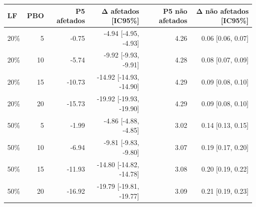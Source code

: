 \begin{tabular}{lrrrrr}
\toprule
LF & PBO & P5 afetados & Δ afetados [IC95\%] & P5 não afetados & Δ não afetados [IC95\%] \\
\midrule
20\% & 5 & -0.75 & -4.94 [-4.95, -4.93] & 4.26 & 0.06 [0.06, 0.07] \\
20\% & 10 & -5.74 & -9.92 [-9.93, -9.91] & 4.28 & 0.08 [0.07, 0.09] \\
20\% & 15 & -10.73 & -14.92 [-14.93, -14.90] & 4.29 & 0.09 [0.08, 0.10] \\
20\% & 20 & -15.73 & -19.92 [-19.93, -19.90] & 4.29 & 0.09 [0.08, 0.10] \\
50\% & 5 & -1.99 & -4.86 [-4.88, -4.85] & 3.02 & 0.14 [0.13, 0.15] \\
50\% & 10 & -6.94 & -9.81 [-9.83, -9.80] & 3.07 & 0.19 [0.17, 0.20] \\
50\% & 15 & -11.93 & -14.80 [-14.82, -14.78] & 3.08 & 0.20 [0.19, 0.22] \\
50\% & 20 & -16.92 & -19.79 [-19.81, -19.77] & 3.09 & 0.21 [0.19, 0.23] \\
\bottomrule
\end{tabular}
